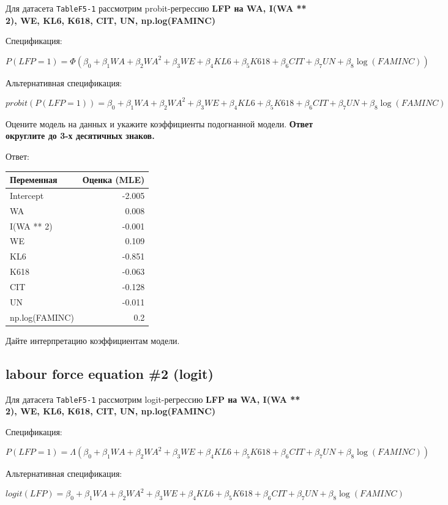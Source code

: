 \documentclass[
  russian,
]{article}
\newcounter{none} %
\begin{document}
Для датасета \texttt{TableF5-1} рассмотрим probit-регрессию \textbf{LFP
на WA, I(WA ** 2), WE, KL6, K618, CIT, UN, np.log(FAMINC)}

Спецификация:

\[
P(LFP=1)=\Phi(\beta_0+\beta_1WA+\beta_2WA^2+\beta_3WE+\beta_4KL6+\beta_5K618+\beta_6CIT+\beta_7UN+\beta_8\log(FAMINC))
\]

Альтернативная спецификация:

\[
probit(P(LFP=1))=\beta_0+\beta_1WA+\beta_2WA^2+\beta_3WE+\beta_4KL6+\beta_5K618+\beta_6CIT+\beta_7UN+\beta_8\log(FAMINC)
\]

Оцените модель на данных и укажите коэффициенты подогнанной модели.
\textbf{Ответ округлите до 3-х десятичных знаков.}

Ответ:

{\def\LTcaptype{none} %
\begin{longtable}[]{@{}lr@{}}
\toprule\noalign{}
Переменная & Оценка (MLE) \\
\midrule\noalign{}
\endhead
\bottomrule\noalign{}
\endlastfoot
Intercept & -2.005 \\
WA & 0.008 \\
I(WA ** 2) & -0.001 \\
WE & 0.109 \\
KL6 & -0.851 \\
K618 & -0.063 \\
CIT & -0.128 \\
UN & -0.011 \\
np.log(FAMINC) & 0.2 \\
\end{longtable}
}

Дайте интерпретацию коэффициентам модели.

\subsection{labour force equation \#2
(logit)}\label{labour-force-equation-2-logit}

Для датасета \texttt{TableF5-1} рассмотрим logit-регрессию \textbf{LFP
на WA, I(WA ** 2), WE, KL6, K618, CIT, UN, np.log(FAMINC)}

Спецификация:

\[
P(LFP=1)=\Lambda(\beta_0+\beta_1WA+\beta_2WA^2+\beta_3WE+\beta_4KL6+\beta_5K618+\beta_6CIT+\beta_7UN+\beta_8\log(FAMINC))
\]

Альтернативная спецификация:

\[
logit(LFP)=\beta_0+\beta_1WA+\beta_2WA^2+\beta_3WE+\beta_4KL6+\beta_5K618+\beta_6CIT+\beta_7UN+\beta_8\log(FAMINC)
\]
\end{document}
